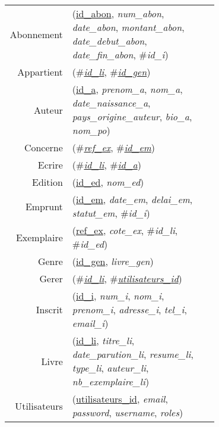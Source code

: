 
\usepackage[normalem]{ulem}
\newenvironment{mld}
  {\par\begin{minipage}{\linewidth}\begin{tabular}{rp{0.7\linewidth}}}
  {\end{tabular}\end{minipage}\par}
\newcommand{\relat}[1]{\textsc{#1}}
\newcommand{\attr}[1]{\emph{#1}}
\newcommand{\prim}[1]{\uline{#1}}
\newcommand{\foreign}[1]{\#\textsl{#1}}


\begin{mld}
  Abonnement & (\prim{id\_abon}, \attr{num\_abon}, \attr{date\_abon}, \attr{montant\_abon}, \attr{date\_debut\_abon}, \attr{date\_fin\_abon}, \foreign{id\_i})\\
  Appartient & (\foreign{\prim{id\_li}}, \foreign{\prim{id\_gen}})\\
  Auteur & (\prim{id\_a}, \attr{prenom\_a}, \attr{nom\_a}, \attr{date\_naissance\_a}, \attr{pays\_origine\_auteur}, \attr{bio\_a}, \attr{nom\_po})\\
  Concerne & (\foreign{\prim{ref\_ex}}, \foreign{\prim{id\_em}})\\
  Ecrire & (\foreign{\prim{id\_li}}, \foreign{\prim{id\_a}})\\
  Edition & (\prim{id\_ed}, \attr{nom\_ed})\\
  Emprunt & (\prim{id\_em}, \attr{date\_em}, \attr{delai\_em}, \attr{statut\_em}, \foreign{id\_i})\\
  Exemplaire & (\prim{ref\_ex}, \attr{cote\_ex}, \foreign{id\_li}, \foreign{id\_ed})\\
  Genre & (\prim{id\_gen}, \attr{livre\_gen})\\
  Gerer & (\foreign{\prim{id\_li}}, \foreign{\prim{utilisateurs\_id}})\\
  Inscrit & (\prim{id\_i}, \attr{num\_i}, \attr{nom\_i}, \attr{prenom\_i}, \attr{adresse\_i}, \attr{tel\_i}, \attr{email\_i})\\
  Livre & (\prim{id\_li}, \attr{titre\_li}, \attr{date\_parution\_li}, \attr{resume\_li}, \attr{type\_li}, \attr{auteur\_li}, \attr{nb\_exemplaire\_li})\\
  Utilisateurs & (\prim{utilisateurs\_id}, \attr{email}, \attr{password}, \attr{username}, \attr{roles})\\
\end{mld}